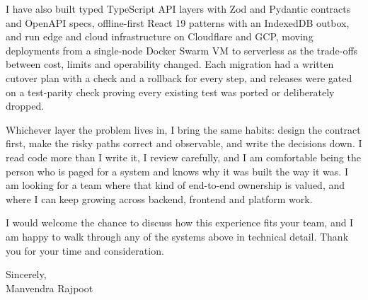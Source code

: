 \documentclass[11pt,a4paper]{article}
\begin{document}
I have also built typed TypeScript API layers with Zod and Pydantic contracts and
OpenAPI specs, offline-first React 19 patterns with an IndexedDB outbox, and run edge and
cloud infrastructure on Cloudflare and GCP, moving deployments from a single-node Docker
Swarm VM to serverless as the trade-offs between cost, limits and operability changed.
Each migration had a written cutover plan with a check and a rollback for every step,
and releases were gated on a test-parity check proving every existing test was ported
or deliberately dropped.

Whichever layer the problem lives in, I bring the same habits: design the contract
first, make the risky paths correct and observable, and write the decisions down. I
read code more than I write it, I review carefully, and I am comfortable being the person
who is paged for a system and knows why it was built the way it was. I am looking for a
team where that kind of end-to-end ownership is valued, and where I can keep growing
across backend, frontend and platform work.

I would welcome the chance to discuss how this experience fits your team, and I am
happy to walk through any of the systems above in technical detail. Thank you for your
time and consideration.


Sincerely,\\[6pt]
Manvendra Rajpoot
\end{document}
